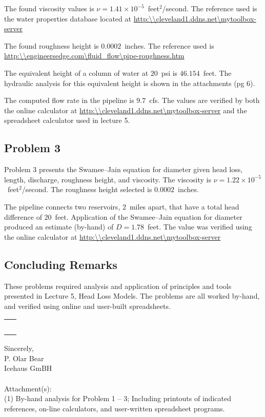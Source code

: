 \documentclass[12pt]{article}
\begin{document}
The found viscosity values is $\nu = 1.41 \times 10^{-5}$~feet$^2$/second.  
The reference used is the water properties database located at \url{http:\\cleveland1.ddns.net\mytoolbox-server}

The found roughness height is $0.0002$~inches. The reference used is \url{http:\\engineersedge.com\fluid_flow\pipe-roughness.htm}

The equivalent height of a column of water at $20$~psi is $46.154$~feet.  The hydraulic analysis for this equivalent height is shown in the attachments (pg 6).

The computed flow rate in the pipeline is $9.7$~cfs.   
The values are verified by both the online calculator at \url{http:\\cleveland1.ddns.net\mytoolbox-server} and the spreadsheet calculator used in lecture 5.

\subsection*{\small{Problem 3}}
Problem 3 presents the Swamee--Jain equation for diameter given head loss, length, discharge, roughness height, and viscosity. 
The viscosity is $\nu = 1.22 \times 10^{-5}$~feet$^2$/second.
The  roughness height selected is $0.0002$~inches.

The pipeline connects two reservoirs, $2$~miles apart, that have a total head difference of $20$~feet.
Application of the Swamee--Jain equation for diameter produced an estimate (by-hand) of $D = 1.78$~feet.  
The value was verified using the online calculator at \url{http:\\cleveland1.ddns.net\mytoolbox-server} 


\subsection*{\small{Concluding Remarks}}
These problems required analysis and application of principles and tools presented in Lecture 5, Head Loss Models.   
The problems are all worked by-hand,  and verified using online and user-built spreadsheets.  


\begin{tabular}{p{6in}}
\hline
~\\
\end{tabular}

Sincerely, \\
P. Olar Bear \\
Icehaus GmBH \\
\\Attachment(s):\\
(1) By-hand analysis for Problem 1 -- 3; Including printouts of indicated references, on-line calculators, and user-written spreadsheet programs.


 
\end{document}
